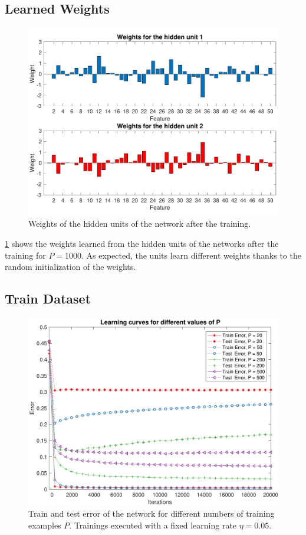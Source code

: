 \subsection{Learned Weights}
\begin{figure}[t]
	\centering
	\includegraphics[width=\columnwidth]{figures/weights_p_1000}
    \caption{Weights of the hidden units of the network after the training.}
	\label{fig:weights}
\end{figure}

\cref{fig:weights} shows the weights learned from the hidden units of the networks after the training for $P = 1000$.
As expected, the units learn different weights thanks to the random initialization of the weights.

\subsection{Train Dataset}
\begin{figure}[t]
	\centering
	\includegraphics[width=\columnwidth]{figures/error_ps}
	\caption{Train and test error of the network for different numbers of training examples $P$. Trainings executed with a fixed learning rate $\eta = 0.05$.}
	\label{fig:ps}
\end{figure}

